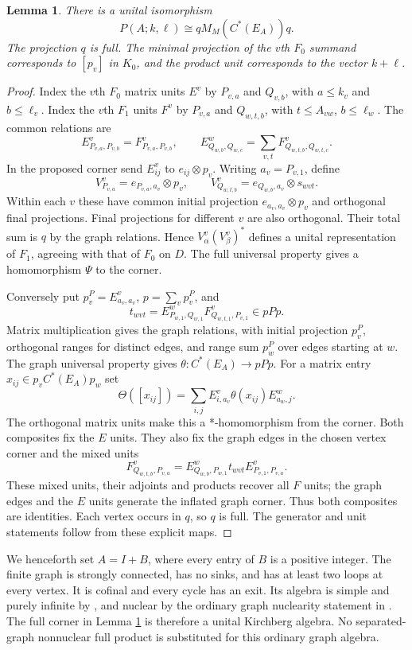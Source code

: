 \documentclass[11pt]{article}
\newtheorem{lemma}[theorem]{Lemma}
\theoremstyle{remark}\newtheorem{remark}[theorem]{Remark}
\begin{document}
\begin{lemma}\label{lem:graph}
There is a unital isomorphism
\[
                  P(A;k,\ell)\cong qM_M(C^*(E_A))q.
\]
The projection $q$ is full. The minimal projection of the $v$th
$F_0$ summand corresponds to $[p_v]$ in $K_0$, and the product unit
corresponds to the vector $k+\ell$.
\end{lemma}
\begin{proof}
Index the $v$th $F_0$ matrix units $E^v$ by $P_{v,a}$ and $Q_{v,b}$,
with $a\le k_v$ and $b\le\ell_v$. Index the $v$th $F_1$ units $F^v$
by $P_{v,a}$ and $Q_{w,t,b}$, with $t\le A_{vw}$, $b\le\ell_w$.
The common relations are
\[
 E^v_{P_{v,a},P_{v,b}}=F^v_{P_{v,a},P_{v,b}},\qquad
 E^w_{Q_{w,b},Q_{w,c}}=\sum_{v,t}F^v_{Q_{w,t,b},Q_{w,t,c}}.
\]
In the proposed corner send $E^v_{ij}$ to $e_{ij}\otimes p_v$.
Writing $a_v=P_{v,1}$, define
\[
 V^v_{P_{v,a}}=e_{P_{v,a},a_v}\otimes p_v,\qquad
 V^v_{Q_{w,t,b}}=e_{Q_{w,b},a_v}\otimes s_{wvt}.
\]
Within each $v$ these have common initial projection
$e_{a_v,a_v}\otimes p_v$ and orthogonal final projections. Final
projections for different $v$ are also orthogonal. Their total sum is
$q$ by the graph relations. Hence $V^v_\alpha(V^v_\beta)^*$ defines
a unital representation of $F_1$, agreeing with that of $F_0$ on $D$.
The full universal property gives a homomorphism $\Psi$ to the corner.

Conversely put $p_v^P=E^v_{a_v,a_v}$, $p=\sum_vp_v^P$, and
\[
 t_{wvt}=E^w_{P_{w,1},Q_{w,1}}F^v_{Q_{w,t,1},P_{v,1}}\in pPp.
\]
Matrix multiplication gives the graph relations, with initial projection
$p_v^P$, orthogonal ranges for distinct edges, and range sum $p_w^P$
over edges starting at $w$. The graph universal property
\cite[Theorem 1.2]{KPR} gives $\theta:C^*(E_A)\to pPp$.
For a matrix entry $x_{ij}\in p_vC^*(E_A)p_w$ set
\[
 \Theta([x_{ij}])=\sum_{i,j}E^v_{i,a_v}\theta(x_{ij})E^w_{a_w,j}.
\]
The orthogonal matrix units make this a *-homomorphism from the corner.
Both composites fix the $E$ units. They also fix the graph edges in the
chosen vertex corner and the mixed units
\[
 F^v_{Q_{w,t,b},P_{v,a}}
       =E^w_{Q_{w,b},P_{w,1}}t_{wvt}E^v_{P_{v,1},P_{v,a}}.
\]
These mixed units, their adjoints and products recover all $F$ units;
the graph edges and the $E$ units generate the inflated graph corner.
Thus both composites are identities. Each vertex occurs in $q$, so $q$
is full. The generator and unit statements follow from these explicit maps.
\end{proof}

We henceforth set $A=I+B$, where every entry of $B$ is a positive integer.
The finite graph is strongly connected, has no sinks, and has at least
two loops at every vertex. It is cofinal and every cycle has an exit.
Its algebra is simple and purely infinite by \cite[Corollary 3.11]{KPR},
and nuclear by the ordinary graph nuclearity statement in
\cite[Remark 3.10]{AG}. The full corner in Lemma \ref{lem:graph} is
therefore a unital Kirchberg algebra. No separated-graph nonnuclear
full product is substituted for this ordinary graph algebra.
\end{document}
